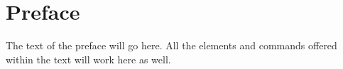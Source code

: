 \cleardoublepage
\chapter*{Preface}

The text of the preface will go here.  All the elements and commands offered within the text will work here as well. 

